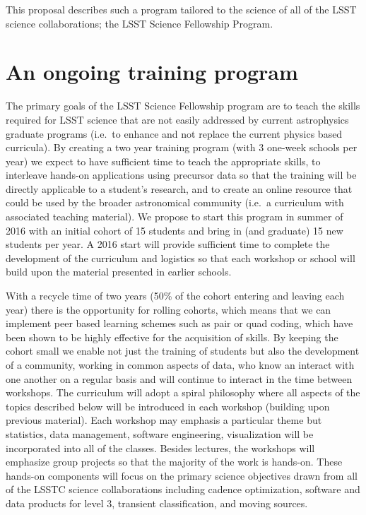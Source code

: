 \documentclass[nofootbib,floatfix,11pt]{article}
\begin{document}
This proposal describes such a program tailored to the science of all of the LSST science collaborations; the LSST Science Fellowship Program. 


\section{An ongoing training program}

The primary goals of the LSST Science Fellowship program are to teach the skills required for LSST science that are not easily addressed by current astrophysics graduate programs (i.e.\ to enhance and not replace the current physics based curricula). By creating a two year training program (with 3 one-week schools per year) we expect to have sufficient time to teach the appropriate skills, to interleave hands-on applications using precursor data so that the training will be directly applicable to a student's research, and to create an online resource that could be used by the broader astronomical community (i.e.\ a curriculum with associated teaching material).  We propose to start this program in summer of 2016 with an initial cohort of 15 students and bring in (and graduate) 15 new students per year. A 2016 start will provide sufficient time to complete the development of the curriculum and logistics so that each workshop or school will build upon the material presented in earlier schools.

With a recycle time of two years (50\% of the cohort entering and leaving each year) there is the opportunity for rolling cohorts, which means that we can implement peer based learning schemes such as pair or quad coding, which have been shown to be highly effective for the acquisition of skills. By keeping the cohort small we enable not just the training of students but also the development of a community, working in common aspects of data, who know an interact with one another on a regular basis and will continue to interact in the time between workshops.  The curriculum will adopt a spiral philosophy where all aspects of the topics described below will be introduced in each workshop (building upon previous material). Each workshop may emphasis a particular theme but statistics, data management, software engineering, visualization will be incorporated into all of the classes. Besides lectures, the workshops will emphasize group projects so that the majority of the work is hands-on. These hands-on components will focus on the primary science objectives drawn from all of the LSSTC science collaborations including cadence optimization, software and data products for level 3, transient classification, and moving sources.
\end{document}
